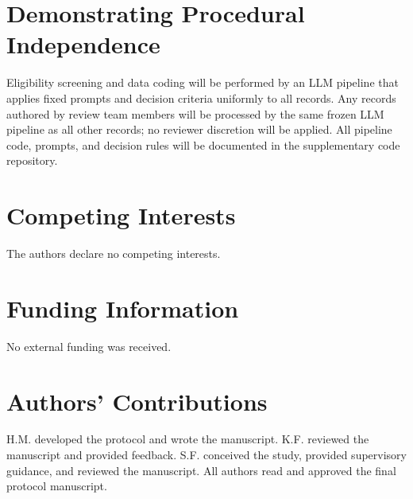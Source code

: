 \documentclass[12pt]{article}
\begin{document}
\section*{Demonstrating Procedural Independence}
Eligibility screening and data coding will be performed by an LLM pipeline that applies fixed prompts and decision criteria uniformly to all records. Any records authored by review team members will be processed by the same frozen LLM pipeline as all other records; no reviewer discretion will be applied. All pipeline code, prompts, and decision rules will be documented in the supplementary code repository.

\newpage


\section*{Competing Interests}
The authors declare no competing interests.

\section*{Funding Information}
No external funding was received.

\section*{Authors' Contributions}
H.M. developed the protocol and wrote the manuscript. K.F. reviewed the manuscript and provided feedback. S.F. conceived the study, provided supervisory guidance, and reviewed the manuscript. All authors read and approved the final protocol manuscript.
\end{document}
